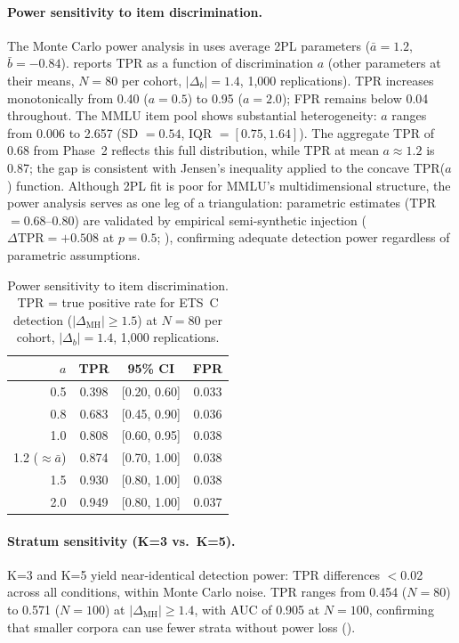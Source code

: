 \paragraph{Power sensitivity to item discrimination.}
\label{app:power_sensitivity}
The Monte Carlo power analysis in  uses average 2PL parameters ($\bar{a} = 1.2$, $\bar{b} = -0.84$).  reports TPR as a function of discrimination $a$ (other parameters at their means, $N = 80$ per cohort, $|\Delta_b| = 1.4$, 1,000 replications). TPR increases monotonically from 0.40 ($a = 0.5$) to 0.95 ($a = 2.0$); FPR remains below 0.04 throughout. The MMLU item pool shows substantial heterogeneity: $a$ ranges from 0.006 to 2.657 (SD $= 0.54$, IQR $= [0.75, 1.64]$). The aggregate TPR of 0.68 from Phase~2 reflects this full distribution, while TPR at mean $a \approx 1.2$ is 0.87; the gap is consistent with Jensen's inequality applied to the concave TPR($a$) function. Although 2PL fit is poor for MMLU's multidimensional structure, the power analysis serves as one leg of a triangulation: parametric estimates (TPR $= 0.68$--$0.80$) are validated by empirical semi-synthetic injection ($\Delta\mathrm{TPR} = {+}0.508$ at $p = 0.5$; ), confirming adequate detection power regardless of parametric assumptions.

\begin{table}[h]
\centering
\caption{Power sensitivity to item discrimination. TPR = true positive rate for ETS~C detection ($|\Delta_{\mathrm{MH}}| \geq 1.5$) at $N = 80$ per cohort, $|\Delta_b| = 1.4$, 1,000 replications.}
\label{tab:power_sensitivity}
\small
\begin{tabular}{rccc}
\toprule
$a$ & TPR & 95\% CI & FPR \\
\midrule
0.5 & 0.398 & [0.20, 0.60] & 0.033 \\
0.8 & 0.683 & [0.45, 0.90] & 0.036 \\
1.0 & 0.808 & [0.60, 0.95] & 0.038 \\
1.2 ($\approx \bar{a}$) & 0.874 & [0.70, 1.00] & 0.038 \\
1.5 & 0.930 & [0.80, 1.00] & 0.038 \\
2.0 & 0.949 & [0.80, 1.00] & 0.037 \\
\bottomrule
\end{tabular}
\end{table}

\paragraph{Stratum sensitivity (K=3 vs.\ K=5).}
\label{app:k3_power}
K=3 and K=5 yield near-identical detection power: TPR differences $<$0.02 across all conditions, within Monte Carlo noise. TPR ranges from 0.454 ($N{=}80$) to 0.571 ($N{=}100$) at $|\Delta_{\mathrm{MH}}| \geq 1.4$, with AUC of 0.905 at $N{=}100$, confirming that smaller corpora can use fewer strata without power loss ().


